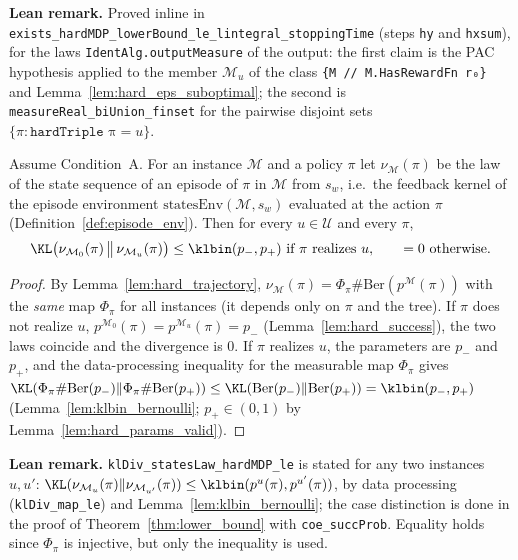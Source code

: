 \textbf{Lean remark.} Proved inline in \texttt{exists\_hardMDP\_lowerBound\_le\_lintegral\_stoppingTime}
(steps \texttt{hy} and \texttt{hxsum}), for the laws \texttt{IdentAlg.outputMeasure} of the output: the
first claim is the PAC hypothesis applied to the member $\mathcal M_u$ of the class
\texttt{\{M // M.HasRewardFn r₀\}} and Lemma~\ref{lem:hard_eps_suboptimal}; the second is
\texttt{measureReal\_biUnion\_finset} for the pairwise disjoint sets $\{\pi : \texttt{hardTriple π} = u\}$.

\begin{lemma}\label{lem:hard_kl_episode}
\leanok
Assume Condition~A. For an instance $\mathcal M$ and a policy $\pi$ let
$\nu_{\mathcal M}(\pi)$ be the law of the state sequence of an episode of $\pi$ in $\mathcal M$
from $s_w$, i.e.\ the feedback kernel of the episode environment
$\mathrm{statesEnv}(\mathcal M, s_w)$ evaluated at the action $\pi$
(Definition~\ref{def:episode_env}). Then for every $u \in \mathcal U$ and every $\pi$,
\[
  \KL\big(\nu_{\mathcal M_0}(\pi) \,\big\|\, \nu_{\mathcal M_u}(\pi)\big) \le \klbin(p_-, p_+) \text{ if } \pi \text{ realizes } u,
  \qquad = 0 \text{ otherwise.}
\]
\end{lemma}

\begin{proof}
\leanok
{}
By Lemma~\ref{lem:hard_trajectory}, $\nu_{\mathcal M}(\pi) = \Phi_\pi \# \mathrm{Ber}(p^{\mathcal M}(\pi))$
with the \emph{same} map $\Phi_\pi$ for all instances (it depends only on $\pi$ and the tree).
If $\pi$ does not realize $u$, $p^{\mathcal M_0}(\pi) = p^{\mathcal M_u}(\pi) = p_-$
(Lemma~\ref{lem:hard_success}), the two laws coincide and the divergence is $0$. If $\pi$
realizes $u$, the parameters are $p_-$ and $p_+$, and the data-processing inequality for the
measurable map $\Phi_\pi$ gives
$\KL(\Phi_\pi\#\mathrm{Ber}(p_-) \| \Phi_\pi\#\mathrm{Ber}(p_+)) \le \KL(\mathrm{Ber}(p_-)\|\mathrm{Ber}(p_+)) = \klbin(p_-, p_+)$
(Lemma~\ref{lem:klbin_bernoulli}; $p_+ \in (0,1)$ by Lemma~\ref{lem:hard_params_valid}).
\end{proof}

\textbf{Lean remark.} \texttt{klDiv\_statesLaw\_hardMDP\_le} is stated for any two instances $u, u'$:
$\KL(\nu_{\mathcal M_u}(\pi) \| \nu_{\mathcal M_{u'}}(\pi)) \le \klbin(p^{u}(\pi), p^{u'}(\pi))$, by data
processing (\texttt{klDiv\_map\_le}) and Lemma~\ref{lem:klbin_bernoulli}; the case distinction is done in
the proof of Theorem~\ref{thm:lower_bound} with \texttt{coe\_succProb}. Equality holds since $\Phi_\pi$
is injective, but only the inequality is used.

